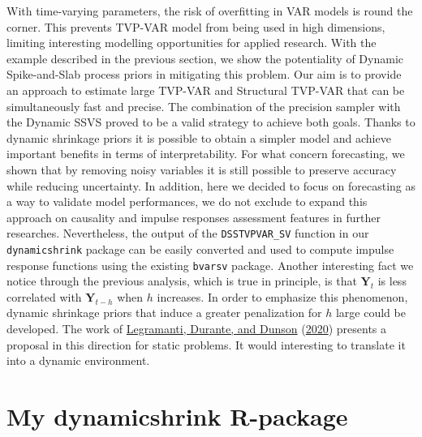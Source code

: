 \documentclass[
  12pt,
]{book}
\theoremstyle{break}
\theoremstyle{nonumberplain}
\begin{document}
With time-varying parameters, the risk of overfitting in VAR models is
round the corner. This prevents TVP-VAR model from being used in high
dimensions, limiting interesting modelling opportunities for applied
research. With the example described in the previous section, we show
the potentiality of Dynamic Spike-and-Slab process priors in mitigating
this problem. Our aim is to provide an approach to estimate large
TVP-VAR and Structural TVP-VAR that can be simultaneously fast and
precise. The combination of the precision sampler with the Dynamic SSVS
proved to be a valid strategy to achieve both goals. Thanks to dynamic
shrinkage priors it is possible to obtain a simpler model and achieve
important benefits in terms of interpretability. For what concern
forecasting, we shown that by removing noisy variables it is still
possible to preserve accuracy while reducing uncertainty. In addition,
here we decided to focus on forecasting as a way to validate model
performances, we do not exclude to expand this approach on causality and
impulse responses assessment features in further researches.
Nevertheless, the output of the \texttt{DSSTVPVAR\_SV} function in our
\texttt{dynamicshrink} package can be easily converted and used to
compute impulse response functions using the existing \texttt{bvarsv}
package. Another interesting fact we notice through the previous
analysis, which is true in principle, is that \(\boldsymbol{Y}_t\) is
less correlated with \(\boldsymbol{Y}_{t-h}\) when \(h\) increases. In
order to emphasize this phenomenon, dynamic shrinkage priors that induce
a greater penalization for \(h\) large could be developed. The work of
\protect\hyperlink{ref-legramanti2020bayesian}{Legramanti, Durante, and
Dunson} (\protect\hyperlink{ref-legramanti2020bayesian}{2020}) presents
a proposal in this direction for static problems. It would interesting
to translate it into a dynamic environment.

\chapter{My dynamicshrink R-package}\label{The dynamicshrink package}
\end{document}
